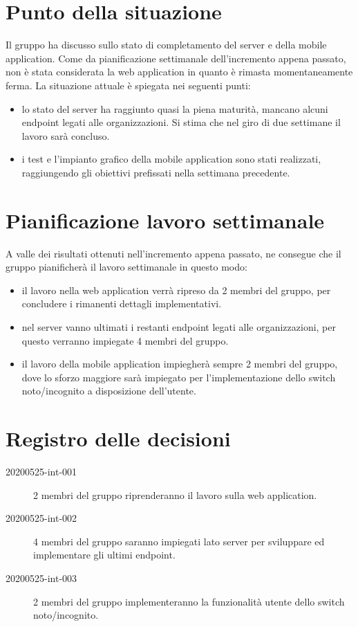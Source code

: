 \documentclass{article}
\begin{document}
\section{Punto della situazione}%
\label{sec:punto_della_situazione}

Il gruppo ha discusso sullo stato di completamento del server e della mobile application. Come da pianificazione settimanale dell'incremento appena passato, non è stata considerata la web application in quanto è rimasta momentaneamente ferma.
La situazione attuale è spiegata nei seguenti punti:
\begin{itemize}
  \item lo stato del server ha raggiunto quasi la piena maturità, mancano alcuni endpoint legati alle organizzazioni. Si stima che nel giro di due settimane il lavoro sarà concluso.
  \item i test e l'impianto grafico della mobile application sono stati realizzati, raggiungendo gli obiettivi prefissati nella settimana precedente.
\end{itemize}

\section{Pianificazione lavoro settimanale}%
\label{sec:pianificazione_lavoro_settimanale}

A valle dei risultati ottenuti nell'incremento appena passato, ne consegue che il gruppo pianificherà il lavoro settimanale in questo modo:
\begin{itemize}
  \item il lavoro nella web application verrà ripreso da 2 membri del gruppo, per concludere i rimanenti dettagli implementativi.
  \item nel server vanno ultimati i restanti endpoint legati alle organizzazioni, per questo verranno impiegate 4 membri del gruppo.
  \item il lavoro della mobile application impiegherà sempre 2 membri del gruppo, dove lo sforzo maggiore sarà impiegato per l'implementazione dello switch noto/incognito a disposizione dell'utente.
\end{itemize}

\newpage
\section{Registro delle decisioni}%
\label{sec:registro_delle_decisioni}

\begin{description}
  \item[20200525-int-001] 2 membri del gruppo riprenderanno il lavoro sulla web application.
  \item[20200525-int-002] 4 membri del gruppo saranno impiegati lato server per sviluppare ed implementare gli ultimi endpoint.
  \item[20200525-int-003] 2 membri del gruppo implementeranno la funzionalità utente dello switch noto/incognito.
\end{description}

\end{document}

